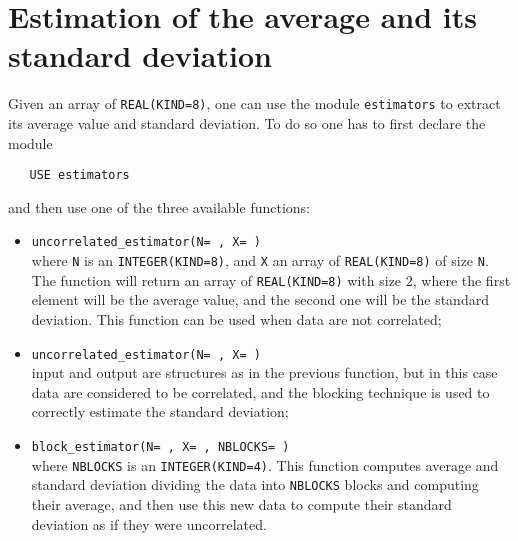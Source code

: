 \documentclass[11pt,a4paper,twoside]{article}
\begin{document}
\section{Estimation of the average and its standard deviation} %
\label{sec:mean_estimation_and_standard_deviation}
Given an array of \verb+REAL(KIND=8)+, one can use the module \verb+estimators+ to extract its average value and standard deviation.
To do so one has to first declare the module
\begin{verbatim}
   USE estimators
\end{verbatim}
and then use one of the three available functions:
\begin{itemize}
   \item \verb+uncorrelated_estimator(N= , X= )+ \\ where \verb+N+ is an \verb+INTEGER(KIND=8)+, and \verb+X+ an array of \verb+REAL(KIND=8)+ of size \verb+N+. The function will return an array of \verb+REAL(KIND=8)+ with size $2$, where the first element will be the average value, and the second one will be the standard deviation. This function can be used when data are not correlated;
   \item \verb+uncorrelated_estimator(N= , X= )+ \\ input and output are structures as in the previous function, but in this case data are considered to be correlated, and the blocking technique is used to correctly estimate the standard deviation;
   \item \verb+block_estimator(N= , X= , NBLOCKS= )+ \\ where \verb+NBLOCKS+ is an \verb+INTEGER(KIND=4)+. This function computes average and standard deviation dividing the data into \verb+NBLOCKS+ blocks and computing their average, and then use this new data to compute their standard deviation as if they were uncorrelated.
\end{itemize}


\printindex
\end{document}
